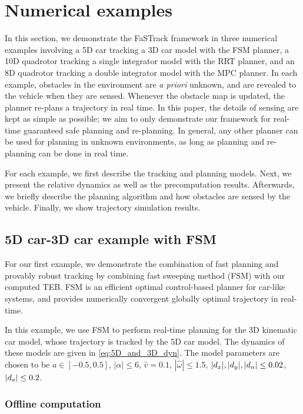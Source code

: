 \section{Numerical examples} \label{sec:results}

In this section, we demonstrate the FaSTrack framework in three numerical examples involving a 5D car tracking a 3D car model with the FSM planner, a 10D quadrotor tracking a single integrator model with the RRT planner, and an 8D quadrotor tracking a double integrator model with the MPC planner.
In each example, obstacles in the environment are \textit{a priori} unknown, and are revealed to the vehicle when they are sensed.
Whenever the obstacle map is updated, the planner re-plans a trajectory in real time.
In this paper, the details of sensing are kept as simple as possible; we aim to only demonstrate our framework for real-time guaranteed safe planning and re-planning.
In general, any other planner can be used for planning in unknown environments, as long as planning and re-planning can be done in real time.

For each example, we first describe the tracking and planning models. 
Next, we present the relative dynamics as well as the precomputation results. 
Afterwards, we briefly describe the planning algorithm and how obstacles are sensed by the vehicle. 
Finally, we show trajectory simulation results.

\subsection{5D car-3D car example with FSM \label{sec:reach_planner}}

For our first example, we demonstrate the combination of fast planning and provably robust tracking by combining fast sweeping method (FSM) \cite{Takei2013} with our computed TEB. 
FSM is an efficient optimal control-based planner for car-like systems, and provides numerically convergent globally optimal trajectory in real-time.

In this example, we use FSM to perform real-time planning for the 3D kinematic car model, whose trajectory is tracked by the 5D car model.
The dynamics of these models are given in \eqref{eq:5D_and_3D_dyn}.
The model parameters are chosen to be $a \in [-0.5, 0.5]$, $|\alpha|\le 6$, $\hat v = 0.1$, $|\hat\omega|\le 1.5$, $|d_x|, |d_y|, |d_\alpha|\le0.02$, $|d_a| \le 0.2$.

\subsubsection{Offline computation}

